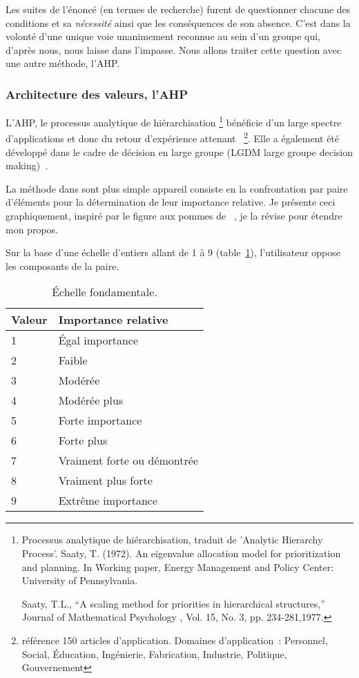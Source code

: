 Les suites de l’énoncé (en termes de recherche) furent de questionner chacune des conditions et sa \textit{nécessité} ainsi que les conséquences de son absence.
C'est dans la volonté d'une unique voie unanimement reconnue au sein d'un groupe qui, d'après nous, nous laisse dans l'impasse.
Nous allons traiter cette question avec une autre méthode, l'\acrshort{AHP}.

\subsubsection{Architecture des valeurs, l'\acrshort{AHP}}
\label{subsubsec:AHP}
L'\acrshort{AHP}, le processus analytique de hiérarchisation
\footnote{
Processus analytique de hiérarchisation, traduit de 'Analytic Hierarchy Process'.
Saaty, T. (1972). An eigenvalue allocation model for prioritization and planning. In Working paper, Energy Management and Policy Center: University of Pennsylvania.

Saaty, T.L., “A scaling method for priorities in hierarchical structures,” Journal of Mathematical Psychology , Vol. 15, No. 3, pp. 234-281,1977.
}
bénéficie d'un large spectre d'applications et donc du retour d'expérience attenant~\cite{vaidya_analytic_2006}
\footnote{\citeauthor{vaidya_analytic_2006}référence 150 articles d'application. Domaines d'application~: Personnel, Social, Éducation, Ingénierie, Fabrication, Industrie, Politique, Gouvernement}.
Elle a également été développé dans le cadre de décision en large groupe (LGDM large groupe decision making)~\cite{liu_method_2016}.

La méthode dans sont plus simple appareil consiste en la confrontation par paire d'éléments pour la détermination de leur importance relative.
Je présente ceci graphiquement,
inspiré par le figure aux pommes de \citeauthor{saaty_fundamentals_2004}~\cite{saaty_fundamentals_2004}, je la révise pour étendre mon propos.

Sur la base d'une échelle d'entiers allant de 1 à 9 (table~\ref{tab:saaty_echelle}), l'utilisateur oppose les composants de la paire.
\begin{table}
\centering
\caption{Échelle fondamentale\cite{saaty_decision_2004}.}
\begin{tabular}{ l l }
\hline
Valeur & Importance relative \\
\hline
1 & Égal importance  \\ 
2 & Faible \\ 
3 & Modérée \\ 
4 & Modérée plus \\ 
5 & Forte importance  \\ 
6 & Forte plus \\ 
7 & Vraiment forte ou démontrée  \\ 
8 & Vraiment plus forte \\ 
9 & Extrême importance \\ 
\hline
\end{tabular}
\label{tab:saaty_echelle}
\end{table}

